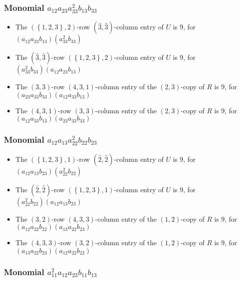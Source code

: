 \documentclass{article}
\begin{document}
\subsubsection{Monomial $ a_{12} a_{23} a_{33}^{2} b_{13} b_{33} $}

\begin{itemize}
\item The $ \left(\left\{1, 2, 3\right\}, 2\right) $-row $ (\hat{3}, \hat{3}) $-column entry of $U$ is $ 9 $, for $( a_{12} a_{23} b_{13} )( a_{33}^{2} b_{33} )$ 
\item The $(\hat{3}, \hat{3})$-row $ \left(\left\{1, 2, 3\right\}, 2\right) $-column entry of $U$ is $ 9 $, for $( a_{33}^{2} b_{33} )( a_{12} a_{23} b_{13} )$ 
\item The $(3, 3)$-row $(4, 3, 1)$-column entry of the $ \left(2, 3\right) $-copy of $R$ is $ 9 $, for $( a_{23} a_{33} b_{33} )( a_{12} a_{33} b_{13} )$ 
\item The $(4, 3, 1)$-row $(3, 3)$-column entry of the $ \left(2, 3\right) $-copy of $R$ is $ 9 $, for $( a_{12} a_{33} b_{13} )( a_{23} a_{33} b_{33} )$ 
\end{itemize}
\subsubsection{Monomial $ a_{12} a_{13} a_{22}^{2} b_{22} b_{23} $}

\begin{itemize}
\item The $ \left(\left\{1, 2, 3\right\}, 1\right) $-row $ (\hat{2}, \hat{2}) $-column entry of $U$ is $ 9 $, for $( a_{12} a_{13} b_{23} )( a_{22}^{2} b_{22} )$ 
\item The $(\hat{2}, \hat{2})$-row $ \left(\left\{1, 2, 3\right\}, 1\right) $-column entry of $U$ is $ 9 $, for $( a_{22}^{2} b_{22} )( a_{12} a_{13} b_{23} )$ 
\item The $(3, 2)$-row $(4, 3, 3)$-column entry of the $ \left(1, 2\right) $-copy of $R$ is $ 9 $, for $( a_{12} a_{22} b_{22} )( a_{13} a_{22} b_{23} )$ 
\item The $(4, 3, 3)$-row $(3, 2)$-column entry of the $ \left(1, 2\right) $-copy of $R$ is $ 9 $, for $( a_{13} a_{22} b_{23} )( a_{12} a_{22} b_{22} )$ 
\end{itemize}
\subsubsection{Monomial $ a_{11}^{2} a_{12} a_{23} b_{11} b_{13} $}
\end{document}
